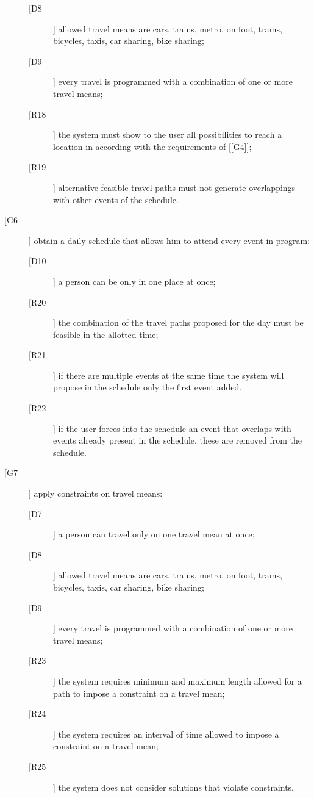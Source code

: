 \begin{description}
\begin{description}
	\item[[D8]] allowed travel means are cars, trains, metro, on foot, trams, bicycles, taxis, car sharing, bike sharing;
	\item[[D9]] every travel is programmed with a combination of one or more travel means;
	\newline
	\item[[R18]] the system must show to the user all possibilities to reach a location in according with the requirements of [[G4]];
	\item[[R19]] alternative feasible travel paths must not generate overlappings with other events of the schedule.
	\end{description}
\item[[G6]] obtain a daily schedule that allows him to attend every event in program:
	\begin{description}
	\item[[D10]] a person can be only in one place at once;
	\newline
	\item[[R20]] the combination of the travel paths proposed for the day must be feasible in the allotted time;
	\item[[R21]] if there are multiple events at the same time the system will propose in the schedule only the first event added.
	\item[[R22]] if the user forces into the schedule an event that overlaps with events already present in the schedule, these are removed from the schedule.
	\end{description}
\item[[G7]] apply constraints on travel means:
	\begin{description}
	\item[[D7]] a person can travel only on one travel mean at once; 
	\item[[D8]] allowed travel means are cars, trains, metro, on foot, trams, bicycles, taxis, car sharing, bike sharing;	
	\item[[D9]] every travel is programmed with a combination of one or more travel means;
	\newline
	\item[[R23]] the system requires minimum and maximum length allowed for a path to impose a constraint on a travel mean;
	\item[[R24]] the system requires an interval of time allowed to impose a constraint on a travel mean;
	\item[[R25]] the system does not consider solutions that violate constraints.

\end{description}
\end{description}
